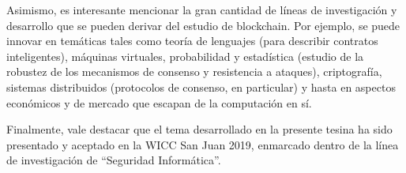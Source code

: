 Asimismo, es interesante mencionar la gran cantidad de líneas de investigación y desarrollo que se pueden derivar del estudio de blockchain. Por ejemplo, se puede innovar en temáticas tales como teoría de lenguajes (para describir contratos inteligentes), máquinas virtuales, probabilidad y estadística (estudio de la robustez de los mecanismos de consenso y resistencia a ataques), criptografía, sistemas distribuidos (protocolos de consenso, en particular) y hasta en aspectos económicos y de mercado que escapan de la computación en sí.

Finalmente, vale destacar que el tema desarrollado en la presente tesina ha sido presentado y aceptado en la WICC San Juan 2019, enmarcado dentro de la línea de investigación de ``Seguridad Informática''.
